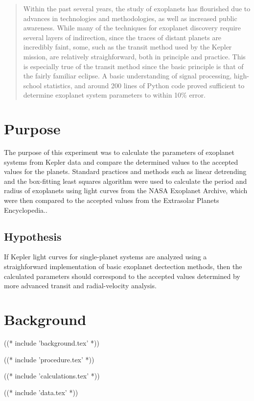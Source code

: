 \documentclass{report}
\begin{document}
\maketitle
\tableofcontents

\begin{abstract}
    Within the past several years, the study of exoplanets has flourished due to advances in technologies and methodologies, as well as increased public awareness.
    While many of the techniques for exoplanet discovery require several layers of indirection, since the traces of distant planets are incredibly faint, some, such as
    the transit method used by the Kepler mission, are relatively straighforward, both in principle and practice. This is especially true of the transit method since the
    basic principle is that of the fairly familiar eclipse. A basic understanding of signal processing, high-school statistics, and around 200 lines of Python code
    proved sufficient to determine exoplanet system parameters to within 10\% error.
\end{abstract}

\section{Purpose}

The purpose of this experiment was to calculate the parameters of exoplanet systems from Kepler data and compare the determined values to the accepted
values for the planets. Standard practices and methods such as linear detrending and the box-fitting least squares algorithm were used to calculate the
period and radius of exoplanets using light curves from the NASA Exoplanet Archive, which were then compared to the accepted values from the Extrasolar
Planets Encyclopedia.\autocite{exoplanetEncyclopedia, exoplanetArchive}.

\subsection{Hypothesis}
If Kepler light curves for single-planet systems are analyzed using a straighforward implementation of basic exoplanet dectection methods, then
the calculated parameters should correspond to the accepted values determined by more advanced transit and radial-velocity analysis.

\section{Background}
% 
((* include 'background.tex' *))

% 
((* include 'procedure.tex' *))

((* include 'calculations.tex' *))

((* include 'data.tex' *))


\nocite{*}
\printbibliography
\end{document}
